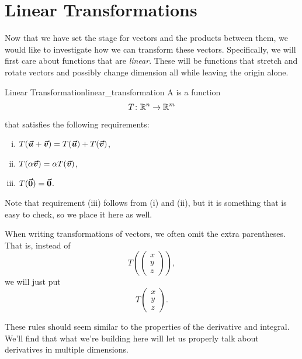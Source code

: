         \section{Linear Transformations}
        Now that we have set the stage for vectors and the products between them, we would like to investigate how we can transform these vectors.  Specifically, we will first care about functions that are \emph{linear}.  These will be functions that stretch and rotate vectors and possibly change dimension all while leaving the origin alone.
        
        \begin{df}{Linear Transformation}{linear_transformation}
        A   is a function
        \[
        T\colon \mathbb{R}^n \to \mathbb{R}^m
        \]
        that satisfies the following requirements:
        \begin{enumerate}[(i)]
            \item $T(\boldsymbol{\boldsymbol{\vec{u}}}+\boldsymbol{\boldsymbol{\vec{v}}})=T(\boldsymbol{\boldsymbol{\vec{u}}})+T(\boldsymbol{\boldsymbol{\vec{v}}})$,
            \item $T(\alpha \boldsymbol{\boldsymbol{\vec{v}}})=\alpha T(\boldsymbol{\boldsymbol{\vec{v}}})$,
            \item $T(\boldsymbol{\vec{0}})=\boldsymbol{\vec{0}}$.
        \end{enumerate}
        Note that requirement (iii) follows from (i) and (ii), but it is something that is easy to check, so we place it here as well.
        \end{df}
        
        \begin{remark}
        When writing transformations of vectors, we often omit the extra parentheses. That is, instead of
        \[
        T \left( \begin{pmatrix} x \\ y \\ z \end{pmatrix} \right),
        \]
        we will just put
        \[
        T \begin{pmatrix} x \\ y \\ z \end{pmatrix}.
        \]
        \end{remark}
        
        \begin{remark}
        These rules should seem similar to the properties of the derivative and integral.  We'll find that what we're building here will let us properly talk about derivatives in multiple dimensions.
        \end{remark}   
        
